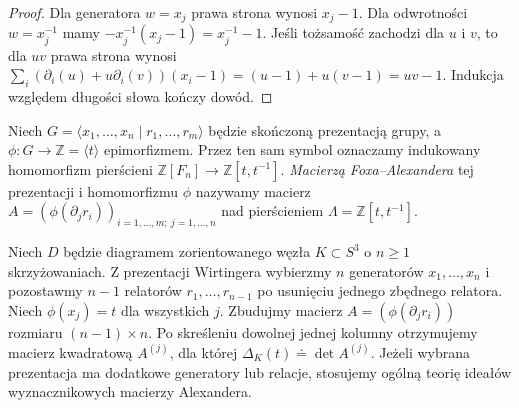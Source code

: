 \begin{proof}
Dla generatora $w=x_j$ prawa strona wynosi $x_j-1$.
Dla odwrotności $w=x_j^{-1}$ mamy
$-x_j^{-1}(x_j-1)=x_j^{-1}-1$. Jeśli tożsamość
zachodzi dla $u$ i $v$, to dla $uv$ prawa strona wynosi
$\sum_i(\partial_i(u)+u\partial_i(v))(x_i-1)
=(u-1)+u(v-1)=uv-1$.
Indukcja względem długości słowa kończy dowód.
\end{proof}

\begin{definicja}
Niech $G=\langle x_1,\dots,x_n\mid r_1,\dots,r_m\rangle$
będzie skończoną prezentacją grupy, a
$\phi\colon G\to\mathbb Z=\langle t\rangle$ epimorfizmem.
Przez ten sam symbol oznaczamy indukowany homomorfizm
pierścieni $\mathbb Z[F_n]\to\mathbb Z[t,t^{-1}]$.
\emph{Macierzą Foxa--Alexandera} tej prezentacji i
homomorfizmu $\phi$ nazywamy macierz
$A=(\phi(\partial_jr_i))_{i=1,\dots,m;\ j=1,\dots,n}$
nad pierścieniem $\Lambda=\mathbb Z[t,t^{-1}]$.
\end{definicja}

\begin{twierdzenie}
Niech $D$ będzie diagramem zorientowanego węzła
$K\subset S^3$ o $n\geq1$ skrzyżowaniach.
Z prezentacji Wirtingera wybierzmy $n$ generatorów
$x_1,\dots,x_n$ i pozostawmy $n-1$ relatorów
$r_1,\dots,r_{n-1}$ po usunięciu jednego zbędnego relatora. Niech
$\phi(x_j)=t$ dla wszystkich $j$. Zbudujmy macierz
$A=(\phi(\partial_jr_i))$ rozmiaru $(n-1)\times n$.
Po skreśleniu dowolnej jednej kolumny otrzymujemy
macierz kwadratową $A^{(j)}$, dla której
$\Delta_K(t)\doteq\det A^{(j)}$.
Jeżeli wybrana prezentacja ma dodatkowe generatory
lub relacje, stosujemy ogólną teorię ideałów
wyznacznikowych macierzy Alexandera.
\end{twierdzenie}


